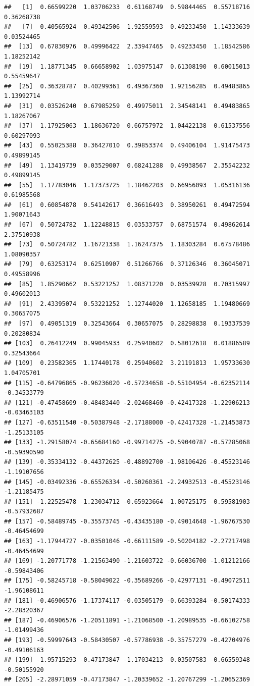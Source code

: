\documentclass[
  notitlepage,
  onecolumn,
  openany]{book}
\begin{document}
\begin{verbatim}
##   [1]  0.66599220  1.03706233  0.61168749  0.59844465  0.55718716  0.36268738
##   [7]  0.40565924  0.49342506  1.92559593  0.49233450  1.14333639  0.03524465
##  [13]  0.67830976  0.49996422  2.33947465  0.49233450  1.18542586  1.18252142
##  [19]  1.18771345  0.66658902  1.03975147  0.61308190  0.60015013  0.55459647
##  [25]  0.36328787  0.40299361  0.49367360  1.92156285  0.49483865  1.13992714
##  [31]  0.03526240  0.67985259  0.49975011  2.34548141  0.49483865  1.18267067
##  [37]  1.17925063  1.18636720  0.66757972  1.04422138  0.61537556  0.60297093
##  [43]  0.55025388  0.36427010  0.39853374  0.49406104  1.91475473  0.49899145
##  [49]  1.13419739  0.03529007  0.68241288  0.49938567  2.35542232  0.49899145
##  [55]  1.17783046  1.17373725  1.18462203  0.66956093  1.05316136  0.61985568
##  [61]  0.60854878  0.54142617  0.36616493  0.38950261  0.49472594  1.90071643
##  [67]  0.50724782  1.12248815  0.03533757  0.68751574  0.49862614  2.37510938
##  [73]  0.50724782  1.16721338  1.16247375  1.18303284  0.67578486  1.08090357
##  [79]  0.63253174  0.62510907  0.51266766  0.37126346  0.36045071  0.49558996
##  [85]  1.85290662  0.53221252  1.08371220  0.03539928  0.70315997  0.49602013
##  [91]  2.43395074  0.53221252  1.12744020  1.12658185  1.19480669  0.30657075
##  [97]  0.49051319  0.32543664  0.30657075  0.28298838  0.19337539  0.20280834
## [103]  0.26412249  0.99045933  0.25940602  0.58012618  0.01886589  0.32543664
## [109]  0.23582365  1.17440178  0.25940602  3.21191813  1.95733630  1.04705701
## [115] -0.64796865 -0.96236020 -0.57234658 -0.55104954 -0.62352114 -0.34533779
## [121] -0.47458609 -0.48483440 -2.02468460 -0.42417328 -1.22906213 -0.03463103
## [127] -0.63511540 -0.50387948 -2.17188000 -0.42417328 -1.21453873 -1.25133105
## [133] -1.29158074 -0.65684160 -0.99714275 -0.59040787 -0.57285068 -0.59390590
## [139] -0.35334132 -0.44372625 -0.48892700 -1.98106426 -0.45523146 -1.19107656
## [145] -0.03492336 -0.65526334 -0.50260361 -2.24932513 -0.45523146 -1.21185475
## [151] -1.22525478 -1.23034712 -0.65923664 -1.00725175 -0.59581903 -0.57932687
## [157] -0.58489745 -0.35573745 -0.43435180 -0.49014648 -1.96767530 -0.46454699
## [163] -1.17944727 -0.03501046 -0.66111589 -0.50204182 -2.27217498 -0.46454699
## [169] -1.20771778 -1.21563490 -1.21603722 -0.66036700 -1.01212166 -0.59843406
## [175] -0.58245718 -0.58049022 -0.35689266 -0.42977131 -0.49072511 -1.96108611
## [181] -0.46906576 -1.17374117 -0.03505179 -0.66393284 -0.50174333 -2.28320367
## [187] -0.46906576 -1.20511891 -1.21068500 -1.20989535 -0.66102758 -1.01499436
## [193] -0.59997643 -0.58430507 -0.57786938 -0.35757279 -0.42704976 -0.49106163
## [199] -1.95715293 -0.47173847 -1.17034213 -0.03507583 -0.66559348 -0.50155920
## [205] -2.28971059 -0.47173847 -1.20339652 -1.20767299 -1.20652369
\end{verbatim}
\end{document}
